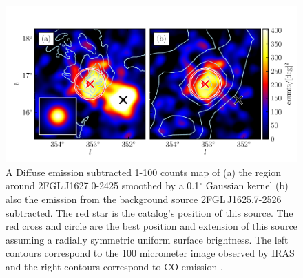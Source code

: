 \documentclass[12pt,preprint]{aastex}
\newcommand{\gev}{\text{GeV}\xspace}
\renewcommand{\deg}{\ensuremath{^\circ}\xspace}
\begin{document}
\begin{figure}
  \begin{center}
    \includegraphics[type=pdf,ext=.pdf,read=.pdf]{source_plots/source_1FGL_J1628.6-2419c}
  \end{center}
  \caption{
  A Diffuse emission subtracted 1-100 \gev counts
  map of (a) the region around 2FGL\,J1627.0-2425 smoothed by a 0.1\deg
  Gaussian kernel (b) also the emission from the background source 
  2FGL\,J1625.7-2526 subtracted.  The red star is the catalog's
  position of this source.  The red cross and circle are the best
  position and extension of this source assuming a radially symmetric
  uniform surface brightness.  The left contours correspond to the
  100 micrometer image observed by IRAS \citep{iras_rho_ophiuci} and the right
  contours correspond to CO emission \citep{co_rho_ophiuci}.
  }\label{1FGL_J1628.6-2419c}
\end{figure}
\end{document}
